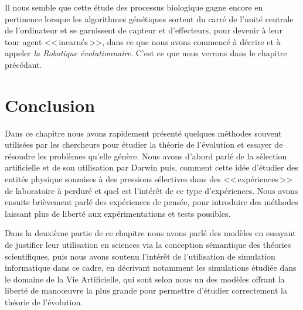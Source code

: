 Il nous semble que cette étude des processus biologique gagne encore en pertinence lorsque les algorithmes génétiques sortent du carré de l'unité centrale de l'ordinateur et se garnissent de capteur et d'effecteurs, pour devenir à leur tour agent <<\,incarnés\,>>, dans ce que nous avons commencé à décrire et à appeler \emph{la Robotique évolutionnaire}. C'est ce que nous verrons dans le chapitre précédant.


\section{Conclusion}
Dans ce chapitre nous avons rapidement présenté quelques méthodes souvent utilisées par les chercheurs pour étudier la théorie de l'évolution et essayer de résoudre les problèmes qu'elle génère. Nous avons d'abord parlé de la sélection artificielle et de son utilisation par Darwin puis, comment cette idée d'étudier des entités physique soumises à des pressions sélectives dans des <<\,expériences\,>> de laboratoire à perduré et quel est l'intérêt de ce type d'expériences. Nous avons ensuite brièvement parlé des expériences de pensée, pour introduire des méthodes laissant plus de liberté aux expérimentations et tests possibles.

Dans la deuxième partie de ce chapitre nous avons parlé des modèles en essayant de justifier leur utilisation en sciences via la conception sémantique des théories scientifiques, puis nous avons soutenu l'intérêt de l'utilisation de simulation informatique dans ce cadre, en décrivant notamment les simulations étudiée dans le domaine de la Vie Artificielle, qui sont selon nous un des modèles offrant la liberté de mano\oe uvre la plus grande pour permettre d'étudier correctement la théorie de l'évolution.

